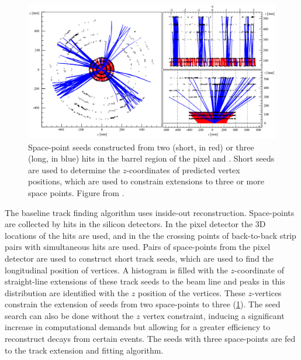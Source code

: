 \begin{figure}[t]
  \includegraphics[width=\linewidth]{soft-pub-2007-007_sp_seeds.png}
  \caption{Space-point seeds constructed from two (short, in red) or three (long, in blue) hits in the barrel region of the pixel and \sct. Short seeds are used to determine the $z$-coordinates of predicted vertex positions, which are used to constrain extensions to three or more space points.  Figure from .}
  \label{fig:trk_seeds}
\end{figure}

The baseline track finding algorithm uses inside-out reconstruction.
Space-points are collected by hits in the silicon detectors.
In the pixel detector the 3D locations of the hits are used, and in the \sct the crossing points of back-to-back strip pairs with simultaneous hits are used.
Pairs of space-points from the pixel detector are used to construct short track seeds, which are used to find the longitudinal position of vertices.
A histogram is filled with the $z$-coordinate of straight-line extensions of these track seeds to the beam line and peaks in this distribution are identified with the $z$ position of the vertices.
These $z$-vertices constrain the extension of seeds from two space-points to three (\cref{fig:trk_seeds}).
The seed search can also be done without the $z$ vertex constraint, inducing a significant increase in computational demands but allowing for a greater efficiency to reconstruct decays from certain events.
The seeds with three space-points are fed to the track extension and fitting algorithm.


